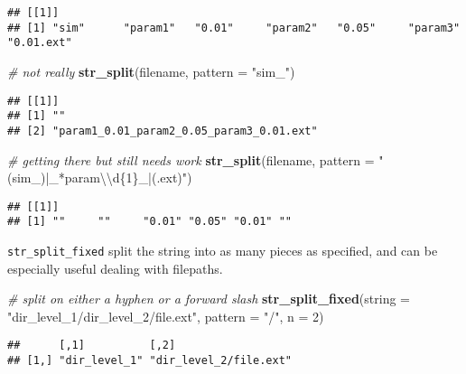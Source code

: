 \documentclass[
]{book}
\newenvironment{Shaded}{}{}
\newcommand{\CharTok}[1]{\textcolor[rgb]{0.25,0.44,0.63}{#1}}
\newcommand{\CommentTok}[1]{\textcolor[rgb]{0.38,0.63,0.69}{\textit{#1}}}
\newcommand{\DataTypeTok}[1]{\textcolor[rgb]{0.56,0.13,0.00}{#1}}
\newcommand{\DecValTok}[1]{\textcolor[rgb]{0.25,0.63,0.44}{#1}}
\newcommand{\KeywordTok}[1]{\textcolor[rgb]{0.00,0.44,0.13}{\textbf{#1}}}
\newcommand{\NormalTok}[1]{#1}
\newcommand{\StringTok}[1]{\textcolor[rgb]{0.25,0.44,0.63}{#1}}
\begin{document}
\begin{verbatim}
## [[1]]
## [1] "sim"      "param1"   "0.01"     "param2"   "0.05"     "param3"   "0.01.ext"
\end{verbatim}

\begin{Shaded}
\begin{Highlighting}[]
\CommentTok{# not really}
\KeywordTok{str_split}\NormalTok{(filename,}
          \DataTypeTok{pattern =} \StringTok{"sim_"}\NormalTok{)}
\end{Highlighting}
\end{Shaded}

\begin{verbatim}
## [[1]]
## [1] ""                                       
## [2] "param1_0.01_param2_0.05_param3_0.01.ext"
\end{verbatim}

\begin{Shaded}
\begin{Highlighting}[]
\CommentTok{# getting there but still needs work}
\KeywordTok{str_split}\NormalTok{(filename,}
          \DataTypeTok{pattern =} \StringTok{"(sim_)|_*param}\CharTok{\textbackslash{}\textbackslash{}}\StringTok{d\{1\}_|(.ext)"}\NormalTok{)}
\end{Highlighting}
\end{Shaded}

\begin{verbatim}
## [[1]]
## [1] ""     ""     "0.01" "0.05" "0.01" ""
\end{verbatim}

\texttt{str\_split\_fixed} split the string into as many pieces as specified, and can be especially useful dealing with filepaths.

\begin{Shaded}
\begin{Highlighting}[]
\CommentTok{# split on either a hyphen or a forward slash}
\KeywordTok{str_split_fixed}\NormalTok{(}\DataTypeTok{string =} \StringTok{"dir_level_1/dir_level_2/file.ext"}\NormalTok{,}
                \DataTypeTok{pattern =} \StringTok{"/"}\NormalTok{,}
                \DataTypeTok{n =} \DecValTok{2}\NormalTok{)}
\end{Highlighting}
\end{Shaded}

\begin{verbatim}
##      [,1]          [,2]                  
## [1,] "dir_level_1" "dir_level_2/file.ext"
\end{verbatim}
\end{document}
